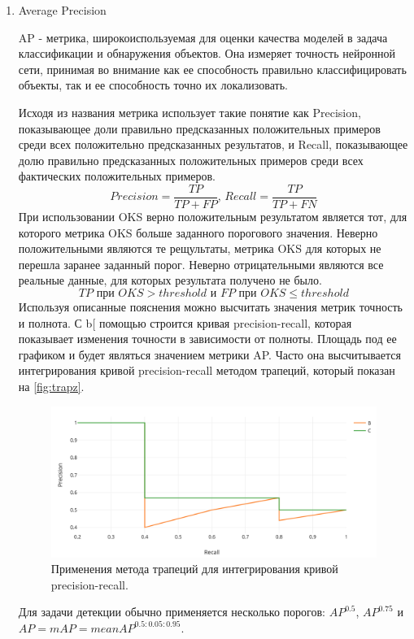 \begin{enumerate}
\item Average Precision

AP - метрика, широкоиспользуемая для оценки качества моделей в задача классификации и обнаружения объектов. Она измеряет точность нейронной сети, принимая во внимание как ее способность правильно классифицировать объекты, так и ее способность точно их локализовать.

Исходя из названия метрика использует такие понятие как Precision, показывающее доли правильно предсказанных положительных примеров среди всех положительно предсказанных результатов, и Recall, показывающее долю правильно предсказанных положительных примеров среди всех фактических положительных примеров.
$$
Precision = \frac{TP}{TP + FP} \text{, } Recall = \frac{TP}{TP + FN}
$$
При использовании OKS верно положительным результатом является тот, для которого метрика OKS больше заданного порогового значения. Неверно положительными являются те рещультаты, метрика OKS для которых не перешла заранее заданный порог. Неверно отрицательными являются все реальные данные, для которых результата получено не было.
$$
TP\text{ при }OKS > threshold\text{ и }FP\text{ при }OKS \leq threshold
$$
Используя описанные пояснения можно высчитать значения метрик точность и полнота. С b[ помощью строится кривая precision-recall, которая показывает изменения точности в зависимости от полноты. Площадь под ее графиком и будет являться значением метрики AP. Часто она высчитывается интегрирования кривой precision-recall методом трапеций, который показан на \autoref{fig:trapz}.

\begin{figure}[h]
	\centering
	\includegraphics[width=.75\textwidth]{./images/AP}
	\caption{Применения метода трапеций для интегрирования кривой precision-recall.}
	\label{fig:trapz}
\end{figure}

Для задачи детекции обычно применяется несколько порогов: $AP^{0.5}$, $AP^{0.75}$ и $AP = mAP = mean AP^{0.5:0.05:0.95}$.

\end{enumerate}

